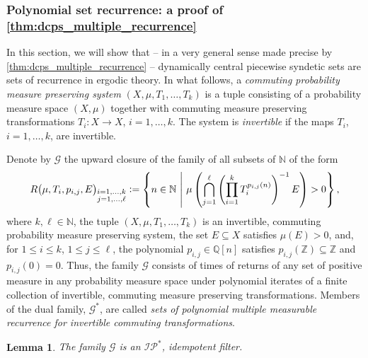 \documentclass[letter,11pt]{article}
\theoremstyle{plain}
\newtheorem{lemma}[theorem]{Lemma}
\theoremstyle{definition}
\theoremstyle{plain}
\theoremstyle{plain}
\numberwithin{equation}{section}
\newcommand{\N}{\mathbb{N}}
\newcommand{\Z}{\mathbb{Z}}
\newcommand{\Q}{\mathbb{Q}}
\newcommand{\defeq}{\vcentcolon=}
\renewcommand{\leq}{\leqslant}
\newcommand{\IP}{\mathcal{IP}}
\newcommand{\filtertwo}{\mathscr{G}}
\newcommand{\familytwo}{\mathscr{G}}
\newcommand{\polyret}{R}
\begin{document}
\subsubsection{Polynomial set recurrence: a proof of \texorpdfstring{\cref{thm:dcps_multiple_recurrence}}{Theorem H}}

In this section, we will show that -- in a very general sense made precise by \cref{thm:dcps_multiple_recurrence} -- dynamically central piecewise syndetic sets are sets of recurrence in ergodic theory.  In what follows, a \emph{commuting probability measure preserving system} $(X, \mu, T_1, \ldots, T_k)$ is a tuple consisting of a probability measure space $(X, \mu)$ together with commuting measure preserving transformations $T_i: X \to X$, $i = 1, \ldots, k$.  The system is \emph{invertible} if the maps $T_i$, $i = 1, \ldots, k$, are invertible.

Denote by $\filtertwo$ the upward closure of the family of all subsets of $\N$ of the form
\begin{align}
    \label{eqn_poly_return_set}
    \polyret \big(\mu, T_i, p_{i,j}, E \big)_{\substack{i = 1, \ldots, k \\ j = 1, \ldots, \ell}} \defeq \left\{ n \in \N \ \middle | \ \mu\left( \bigcap_{j=1}^{\ell} \left( \prod_{i=1}^{k} T_i^{p_{i,j}(n)} \right)^{-1} E \right) > 0 \right\},
\end{align}
where $k, \ell \in \N$, the tuple $(X, \mu, T_1, \ldots, T_k)$ is an invertible, commuting probability measure preserving system, the set $E \subseteq X$ satisfies $\mu(E) > 0$, and, for $1 \leq i \leq k$, $1 \leq j \leq \ell$, the polynomial $p_{i, j} \in \Q[n]$ satisfies $p_{i,j}(\Z) \subseteq \Z$ and $p_{i,j}(0) = 0$.  Thus, the family $\filtertwo$ consists of times of returns of any set of positive measure in any probability measure space under polynomial iterates of a finite collection of invertible, commuting measure preserving transformations.  Members of the dual family, $\familytwo^*$, are called \emph{sets of polynomial multiple measurable recurrence for invertible commuting transformations}.



\begin{lemma}
\label{lemma_localization_is_syndetic_idempotent_filter}
    The family $\filtertwo$ is an $\IP^*$, idempotent filter.
\end{lemma}
\end{document}
